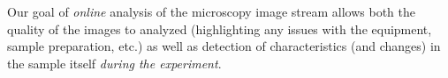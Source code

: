 \documentclass[letterpaper,conference]{IEEEtran}
\begin{document}
Our goal of \emph{online} analysis of the microscopy image stream allows both the quality of the images to analyzed (highlighting any issues with the equipment, sample preparation, etc.) as well as detection of characteristics (and changes) in the sample itself \emph{during the experiment}. 
\end{document}
